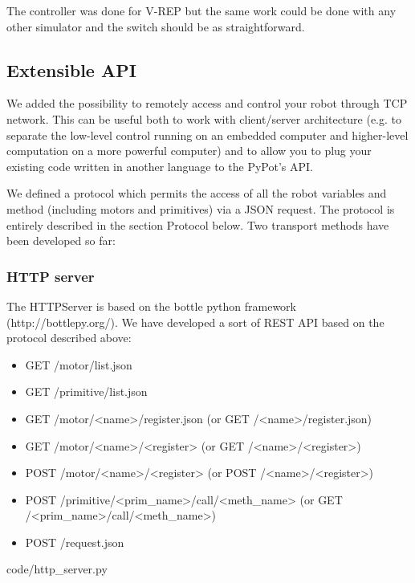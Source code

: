 The controller was done for V-REP but the same work could be done with any other simulator and the switch should be as straightforward.


\subsection{Extensible API} %

We added the possibility to remotely access and control your robot through TCP network. This can be useful both to work with client/server architecture (e.g. to separate the low-level control running on an embedded computer and higher-level computation on a more powerful computer) and to allow you to plug your existing code written in another language to the PyPot’s API.

We defined a protocol which permits the access of all the robot variables and method (including motors and primitives) via a JSON request. The protocol is entirely described in the section Protocol below. Two transport methods have been developed so far:

\subsubsection{HTTP server} %

The HTTPServer is based on the bottle python framework (http://bottlepy.org/). We have developed a sort of REST API based on the protocol described above:

\begin{itemize}
    \item GET /motor/list.json
    \item GET /primitive/list.json
    \item GET /motor/<name>/register.json (or GET /<name>/register.json)
    \item GET /motor/<name>/<register> (or GET /<name>/<register>)
    \item POST /motor/<name>/<register> (or POST /<name>/<register>)
    \item POST /primitive/<prim\_name>/call/<meth\_name> (or GET /<prim\_name>/call/<meth\_name>)
    \item POST /request.json
\end{itemize}



    {code/http_server.py}


